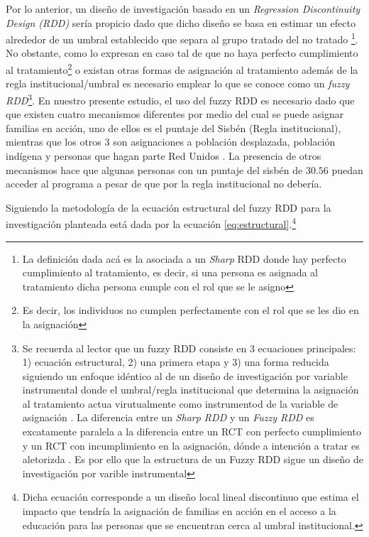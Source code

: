 \documentclass[AER]{AEA}
\begin{document}
Por lo anterior, un diseño de investigación basado en un \textit{Regression Discontinuity Design (RDD)} sería propicio dado que dicho diseño se basa en estimar un efecto alrededor de un umbral establecido que separa al grupo tratado del no tratado \citep{Lee2010RegressionEconomics}\footnote{La definición dada acá es la asociada a un \textit{Sharp} RDD donde hay perfecto cumplimiento al tratamiento, es decir, si una persona es asignada al tratamiento dicha persona cumple con el rol que se le asigno}. No obstante, como lo expresan \cite{Lee2010RegressionEconomics} en caso tal de que no haya perfecto cumplimiento al tratamiento\footnote{Es decir, los individuos no cumplen perfectamente con el rol que se les dio en la asignación} o existan otras formas de asignación al tratamiento además de la regla institucional/umbral es necesario emplear lo que se conoce como un \textit{fuzzy RDD}\footnote{Se recuerda al lector que un fuzzy RDD consiste en 3 ecuaciones principales: 1) ecuación estructural, 2) una primera etapa y 3) una forma reducida siguiendo un enfoque idéntico al de un diseño de investigación por variable instrumental donde el umbral/regla institucional que determina la asignación al tratamiento actua virutualmente como instrumentod de la variable de asignación \citep{Cunningham2018CAUSAL1.7}. La diferencia entre un \textit{Sharp RDD} y un \textit{Fuzzy RDD} es excatamente paralela a la diferencia entre un RCT con perfecto cumplimiento y un RCT con incumplimiento en la asignación, dónde a intención a tratar es aletorizda \citep{Lee2010RegressionEconomics}. Es por ello que la estructura de un Fuzzy RDD sigue un diseño de investigación por varible instrumental}. En nuestro presente estudio, el uso del fuzzy RDD es necesario dado que que existen cuatro mecanismos diferentes por medio del cual se puede asignar familias en acción, uno de ellos es el puntaje del Sisbén (Regla institucional), mientras que los otros 3 son asignaciones a población desplazada, población indígena y personas que hagan parte Red Unidos   \citep{Robles2018Las2001-2018}. La presencia de otros mecanismos hace que algunas personas con un puntaje del sisbén de $30.56$ puedan acceder al programa a pesar de que por la regla institucional no debería. 
 
Siguiendo la metodología de \cite{Angrist2008MostlyCompanion} la ecuación estructural del fuzzy RDD para la investigación planteada está dada por la ecuación \ref{eq:estructural}.\footnote{Dicha ecuación corresponde a un diseño local lineal discontinuo que estima el impacto que tendría la asignación de familias en acción en el acceso a la educación para las personas que se encuentran cerca al umbral institucional.} 
\end{document}
